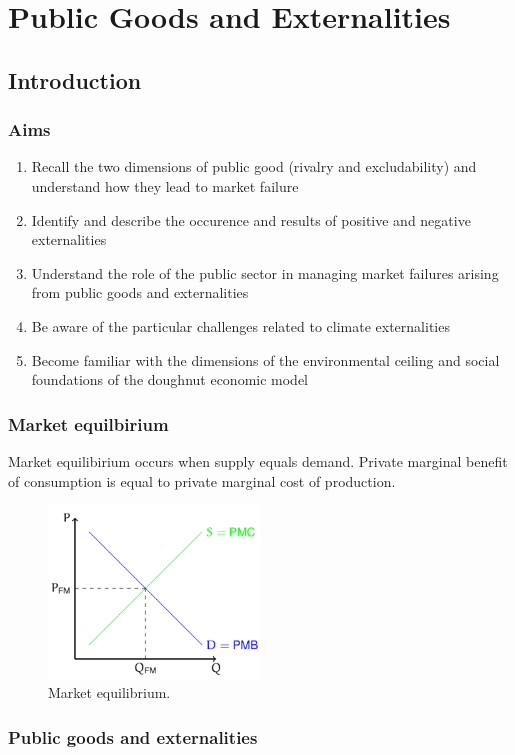 \documentclass[class=report, crop=false, 12pt,a4paper]{standalone}
\begin{document}
\chapter{Public Goods and Externalities}
\section{Introduction}
\subsection{Aims}
\begin{enumerate}
	\item Recall the two dimensions of public good (rivalry and excludability) and understand how they lead to market failure
	\item Identify and describe the occurence and results of positive and negative externalities
	\item Understand the role of the public sector in managing market failures arising from public goods and externalities
	\item Be aware of the particular challenges related to climate externalities
	\item Become familiar with the dimensions of the environmental ceiling and social foundations of the doughnut economic model
\end{enumerate}
\subsection{Market equilbirium}
Market equilibirium occurs when supply equals demand. Private marginal benefit of consumption is equal to private marginal cost of production.
\begin{figure}[H]
	\centering
	\includegraphics[width = 0.5\textwidth]{../img/figure13.png}
	\caption{Market equilibrium.}
\end{figure}
\subsection{Public goods and externalities}
\end{document}
